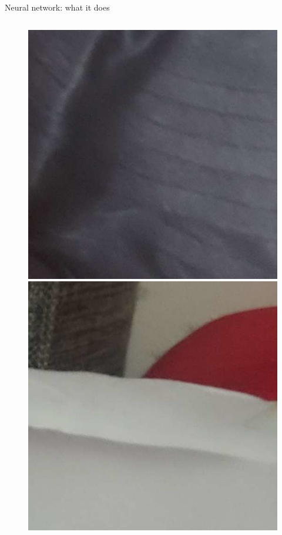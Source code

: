 \documentclass{beamer}
\begin{document}
\begin{frame}{Neural network: what it does}
\begin{columns}
\begin{column}{0.05\textwidth}
\begin{figure}
                \includegraphics[width=\linewidth]{distorted/distorted-2-3}
                \includegraphics[width=\linewidth]{distorted/distorted-3-0}

\end{figure}
\end{column}
\end{columns}
\end{frame}
\end{document}

